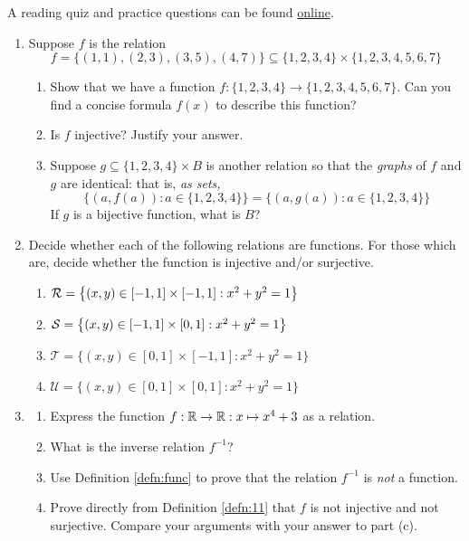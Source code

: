 \begin{exercises}{}{}
	A reading quiz and practice questions can be found \href{http://www.math.uci.edu/~ndonalds/math13/selftest/7-2-functions.html}{online}.

	\begin{enumerate}
	  \item Suppose $f$ is the relation
	  \[
	  	f=\bigl\{(1,1),(2,3),(3,5),(4,7)\bigr\} \subseteq\{1,2,3,4\}\times\{1,2,3,4,5,6,7\}
	  \]
	  \begin{enumerate}
	    \item Show that we have a function $f:\{1,2,3,4\}\to\{1,2,3,4,5,6,7\}$. Can you find a concise formula $f(x)$ to describe this function?
	    \item Is $f$ injective? Justify your answer.
	    \item Suppose $g\subseteq\{1,2,3,4\}\times B$ is another relation so that the \emph{graphs} of $f$ and $g$ are identical: that is, \emph{as sets,}
	    \[
	    	\bigl\{(a,f(a)):a\in\{1,2,3,4\}\bigr\} = \bigl\{(a,g(a)):a\in\{1,2,3,4\}\bigr\}
	    \]
	    If $g$ is a bijective function, what is $B$?
	  \end{enumerate}
	  
	  \item Decide whether each of the following relations are functions. For those which are, decide whether the function is injective and/or surjective.
	  \begin{enumerate}
	    \item $\mathcal{R}=\bigl\{(x,y)\in[-1,1]\times[-1,1]:x^2+y^2=1\bigr\}$
	    \item $\mathcal{S}=\bigl\{(x,y)\in[-1,1]\times[0,1]:x^2+y^2=1\bigr\}$
	    \item $\mathcal T=\bigl\{(x,y)\in[0,1]\times[-1,1]:x^2+y^2=1\bigr\}$
	    \item $\mathcal U=\bigl\{(x,y)\in[0,1]\times[0,1]:x^2+y^2=1\bigr\}$
	  \end{enumerate}
	    
	  
	  \item\begin{enumerate}
	    \item Express the function $f:\mathbb{R}\to\mathbb{R}:x\mapsto x^4+3$ as a relation.
	    \item What is the inverse relation $f^{-1}$?
	    \item Use Definition \ref{defn:func} to prove that the relation $f^{-1}$ is \emph{not} a function.
	    \item Prove directly from Definition \ref{defn:11} that $f$ is not injective and not surjective. Compare your arguments with your answer to part (c).
	  \end{enumerate}
	  

\end{enumerate}
\end{exercises}
